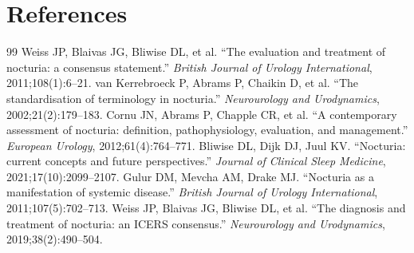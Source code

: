 \section*{References}
\begin{thebibliography}{99}
 Weiss JP, Blaivas JG, Bliwise DL, et al. ``The evaluation and treatment of nocturia: a consensus statement.'' \textit{British Journal of Urology International}, 2011;108(1):6--21.
 van Kerrebroeck P, Abrams P, Chaikin D, et al. ``The standardisation of terminology in nocturia.'' \textit{Neurourology and Urodynamics}, 2002;21(2):179--183.
 Cornu JN, Abrams P, Chapple CR, et al. ``A contemporary assessment of nocturia: definition, pathophysiology, evaluation, and management.'' \textit{European Urology}, 2012;61(4):764--771.
 Bliwise DL, Dijk DJ, Juul KV. ``Nocturia: current concepts and future perspectives.'' \textit{Journal of Clinical Sleep Medicine}, 2021;17(10):2099--2107.
 Gulur DM, Mevcha AM, Drake MJ. ``Nocturia as a manifestation of systemic disease.'' \textit{British Journal of Urology International}, 2011;107(5):702--713.
 Weiss JP, Blaivas JG, Bliwise DL, et al. ``The diagnosis and treatment of nocturia: an ICERS consensus.'' \textit{Neurourology and Urodynamics}, 2019;38(2):490--504.

\end{thebibliography}

